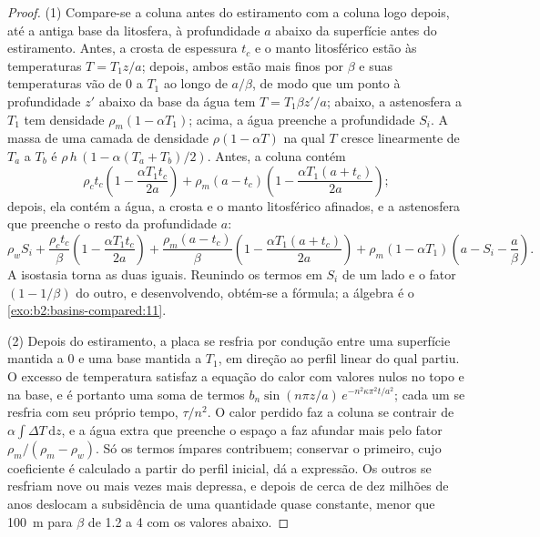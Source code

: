 \begin{proof}
(1) Compare-se a coluna antes do estiramento com a coluna logo depois, até a antiga base da
litosfera, à profundidade $a$ abaixo da superfície antes do estiramento. Antes, a crosta de
espessura $t_c$ e o manto litosférico estão às temperaturas $T = T_1 z/a$; depois, ambos estão
mais finos por $\beta$ e suas temperaturas vão de $0$ a $T_1$ ao longo de $a/\beta$, de modo que um ponto
à profundidade $z'$ abaixo da base da água tem $T = T_1\beta z'/a$; abaixo, a astenosfera a
$T_1$ tem densidade $\rho_m(1 - \alpha T_1)$; acima, a água preenche a profundidade $S_i$. A massa de uma
camada de densidade $\rho(1 - \alpha T)$ na qual $T$ cresce linearmente de $T_a$ a $T_b$ é
$\rho\,h\,(1 - \alpha(T_a + T_b)/2)$. Antes, a coluna contém
\[
  \rho_c t_c\left(1 - \frac{\alpha T_1 t_c}{2a}\right)
  + \rho_m (a - t_c)\left(1 - \frac{\alpha T_1 (a + t_c)}{2a}\right);
\]
depois, ela contém a água, a crosta e o manto litosférico afinados, e a astenosfera que
preenche o resto da profundidade $a$:
\[
  \rho_w S_i + \frac{\rho_c t_c}{\beta}\left(1 - \frac{\alpha T_1 t_c}{2a}\right)
  + \frac{\rho_m (a - t_c)}{\beta}\left(1 - \frac{\alpha T_1 (a + t_c)}{2a}\right)
  + \rho_m(1 - \alpha T_1)\left(a - S_i - \frac{a}{\beta}\right).
\]
A isostasia torna as duas iguais. Reunindo os termos em $S_i$ de um lado e o fator
$(1 - 1/\beta)$ do outro, e desenvolvendo, obtém-se a fórmula; a álgebra é o
\cref{exo:b2:basins-compared:11}.

(2) Depois do estiramento, a placa se resfria por condução entre uma superfície mantida a $0$ e uma base mantida
a $T_1$, em direção ao perfil linear do qual partiu. O excesso de temperatura satisfaz a equação do
calor com valores nulos no topo e na base, e é portanto uma soma de termos
$b_n\sin(n\pi z/a)\,e^{-n^2\kappa\pi^2 t/a^2}$; cada um se resfria com seu próprio tempo, $\tau/n^2$. O
calor perdido faz a coluna se contrair de $\alpha\int \Delta T\,\mathrm{d}z$, e a água extra
que preenche o espaço a faz afundar mais pelo fator $\rho_m/(\rho_m - \rho_w)$. Só os termos ímpares
contribuem; conservar o primeiro, cujo coeficiente é calculado a partir do perfil inicial, dá
a expressão. Os outros se resfriam nove ou mais vezes mais depressa, e depois de cerca de dez milhões de anos
deslocam a subsidência de uma quantidade quase constante, menor que \qty{100}{m} para $\beta$ de
1.2 a 4 com os valores abaixo.
\end{proof}

